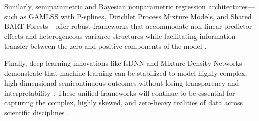 Similarly, semiparametric and Bayesian nonparametric regression architectures—such as GAMLSS with P-splines, Dirichlet Process Mixture Models, and Shared BART Forests—offer robust frameworks that accommodate non-linear predictor effects and heterogeneous variance structures while facilitating information transfer between the zero and positive components of the model \cite{stasinopoulos2017, ferguson1973, shared_forests}. 

Finally, deep learning innovations like fsDNN and Mixture Density Networks demonstrate that machine learning can be stabilized to model highly complex, high-dimensional semicontinuous outcomes without losing transparency and interpretability \cite{zou2025sdnn, bishop1994}. These unified frameworks will continue to be essential for capturing the complex, highly skewed, and zero-heavy realities of data across scientific disciplines \cite{zou2025sdnn, bart2010}.

